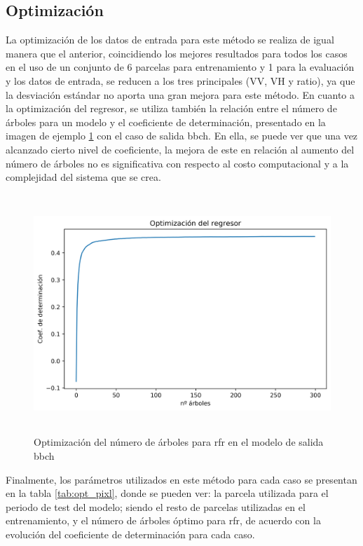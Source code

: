 \subsection{Optimización}
\par La optimización de los datos de entrada para este método se realiza de igual manera que el anterior, coincidiendo los mejores resultados para todos los casos en el uso de un conjunto de 6 parcelas para entrenamiento y 1 para la evaluación y los datos de entrada, se reducen a los tres principales (VV, VH y ratio), ya que la desviación estándar no aporta una gran mejora para este método. En cuanto a la optimización del regresor, se utiliza también la relación entre el número de árboles para un modelo y el coeficiente de determinación, presentado en la imagen de ejemplo \ref{fig:opt_pixl} con el caso de salida \gls{bbch}. En ella, se puede ver que una vez alcanzado cierto nivel de coeficiente, la mejora de este en relación al aumento del número de árboles no es significativa con respecto al costo computacional y a la complejidad del sistema que se crea. 
\begin{figure}[h]
    \centering
    \includegraphics[height=9cm]{archivos/tfg/Pixel/opt_tree_bbch_pixel} 
    \caption{Optimización del número de árboles para \gls{rfr} en el modelo de salida \gls{bbch}}
    \label{fig:opt_pixl}
\end{figure}

\par Finalmente, los parámetros utilizados en este método para cada caso se presentan en la tabla \ref{tab:opt_pixl}, donde se pueden ver: la parcela utilizada para el periodo de test del modelo; siendo el resto de parcelas utilizadas en el entrenamiento, y el número de árboles óptimo para \gls{rfr}, de acuerdo con la evolución del coeficiente de determinación para cada caso.

